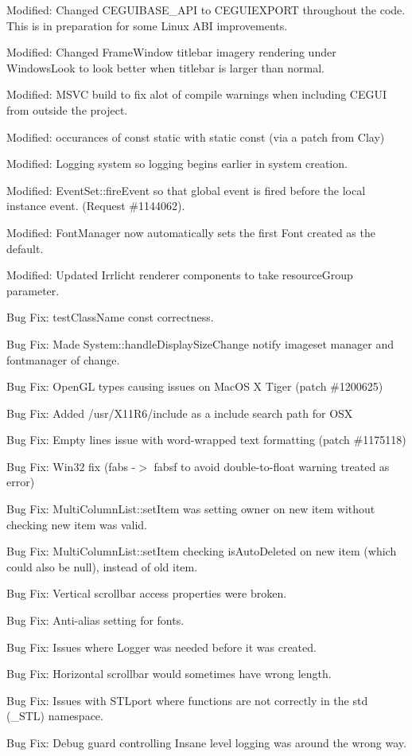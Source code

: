 \begin{DoxyItemize}
\item Modified\+: Changed C\+E\+G\+U\+I\+B\+A\+S\+E\+\_\+\+A\+PI to C\+E\+G\+U\+I\+E\+X\+P\+O\+RT throughout the code. This is in preparation for some Linux A\+BI improvements.
\item Modified\+: Changed Frame\+Window titlebar imagery rendering under Windows\+Look to look better when titlebar is larger than \textquotesingle{}normal\textquotesingle{}.
\item Modified\+: M\+S\+VC build to fix alot of compile warnings when including C\+E\+G\+UI from outside the project.
\item Modified\+: occurances of \textquotesingle{}const static\textquotesingle{} with \textquotesingle{}static const\textquotesingle{} (via a patch from Clay)
\item Modified\+: Logging system so logging begins earlier in system creation.
\item Modified\+: Event\+Set\+::fire\+Event so that global event is fired before the local instance event. (Request \#1144062).
\item Modified\+: Font\+Manager now automatically sets the first Font created as the default.
\item Modified\+: Updated Irrlicht renderer components to take resource\+Group parameter.
\item Bug Fix\+: test\+Class\+Name const correctness.
\item Bug Fix\+: Made System\+::handle\+Display\+Size\+Change notify imageset manager and fontmanager of change.
\item Bug Fix\+: Open\+GL types causing issues on Mac\+OS X Tiger (patch \#1200625)
\item Bug Fix\+: Added /usr/\+X11\+R6/include as a include search path for O\+SX
\item Bug Fix\+: Empty lines issue with word-\/wrapped text formatting (patch \#1175118)
\item Bug Fix\+: Win32 fix (fabs -\/$>$ fabsf to avoid double-\/to-\/float warning treated as error)
\item Bug Fix\+: Multi\+Column\+List\+::set\+Item was setting owner on new item without checking new item was valid.
\item Bug Fix\+: Multi\+Column\+List\+::set\+Item checking \textquotesingle{}is\+Auto\+Deleted\textquotesingle{} on new item (which could also be null), instead of old item.
\item Bug Fix\+: Vertical scrollbar access properties were broken.
\item Bug Fix\+: Anti-\/alias setting for fonts.
\item Bug Fix\+: Issues where Logger was needed before it was created.
\item Bug Fix\+: Horizontal scrollbar would sometimes have wrong length.
\item Bug Fix\+: Issues with S\+T\+Lport where functions are not correctly in the std (\+\_\+\+S\+TL) namespace.
\item Bug Fix\+: Debug guard controlling Insane level logging was around the wrong way.
\end{DoxyItemize}

